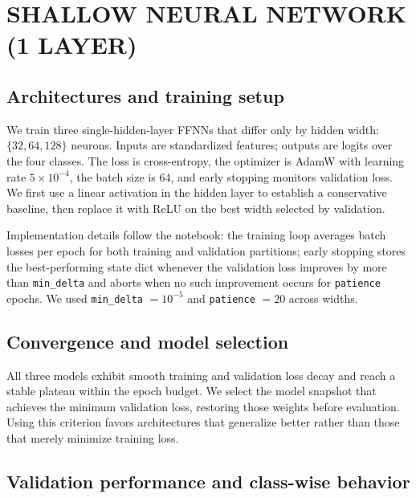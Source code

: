 
\section{SHALLOW NEURAL NETWORK (1 LAYER)} \label{sec:shallow-nn}

    \subsection{Architectures and training setup}

        We train three single-hidden-layer FFNNs that differ only by hidden width:
        $\{32, 64, 128\}$ neurons. Inputs are standardized features; outputs are logits over the four classes. 
        The loss is cross-entropy, the optimizer is AdamW with learning rate $5\times 10^{-4}$, the batch size is 64, and early stopping monitors validation loss. 
        We first use a linear activation in the hidden layer to establish a conservative baseline, then replace it with ReLU on the best width selected by validation.

        Implementation details follow the notebook: the training loop averages batch losses per epoch for both training and validation partitions; early stopping stores the best-performing state dict whenever the validation loss improves by more than \texttt{min\_delta} and aborts when no such improvement occurs for \texttt{patience} epochs. 
        We used \texttt{min\_delta} $=10^{-5}$ and \texttt{patience} $=20$ across widths.

    \subsection{Convergence and model selection}

        All three models exhibit smooth training and validation loss decay and reach a stable plateau within the epoch budget. 
        We select the model snapshot that achieves the minimum validation loss, restoring those weights before evaluation. 
        Using this criterion favors architectures that generalize better rather than those that merely minimize training loss.

    \subsection{Validation performance and class-wise behavior}


